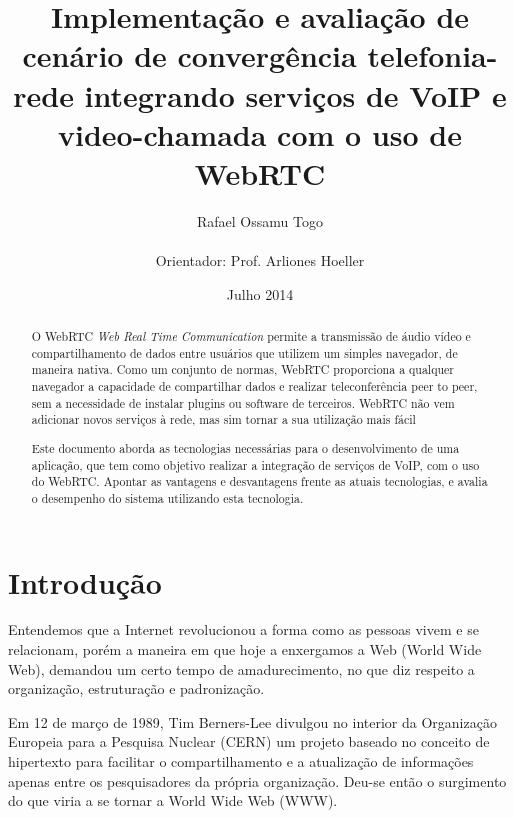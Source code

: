 \documentclass[ruledheader]{abnt} %
\begin{document}
\title{Implementação e avaliação de cenário de convergência telefonia-rede integrando serviços de VoIP e video-chamada com o uso de WebRTC}
\author{Rafael Ossamu Togo \\ \\ Orientador: Prof. Arliones Hoeller} %
\date{Julho 2014}

\maketitle %

\tableofcontents 

\begin{abstract}
O WebRTC \textit{Web Real Time Communication} permite a transmissão de áudio vídeo e compartilhamento de dados entre usuários que utilizem um simples navegador, de maneira nativa. Como um conjunto de normas, WebRTC proporciona a qualquer navegador a capacidade de compartilhar dados e realizar teleconferência peer to peer, sem a necessidade de instalar plugins ou software de terceiros. WebRTC não vem adicionar novos serviços à
rede, mas sim tornar a sua utilização mais fácil

Este documento aborda as tecnologias necessárias para o desenvolvimento de uma aplicação, que tem como objetivo realizar a integração de serviços de VoIP, com o uso do WebRTC. Apontar as vantagens e desvantagens frente as atuais tecnologias,  e avalia o desempenho do sistema utilizando esta tecnologia.  

\end{abstract}


\chapter{Introdução} %
\label{c_introducao} %
Entendemos que a Internet revolucionou a forma como as pessoas vivem e se relacionam, porém a maneira em que hoje a enxergamos a Web (World Wide Web), demandou um certo tempo de amadurecimento, no que diz respeito a organização, estruturação e padronização.
 
Em 12 de março de 1989, Tim Berners-Lee divulgou no interior da Organização Europeia para a Pesquisa Nuclear (CERN) um projeto baseado no conceito de hipertexto para facilitar o compartilhamento e a atualização de informações apenas entre os pesquisadores da própria organização. Deu-se então o surgimento do que viria a se tornar a World Wide Web (WWW). 
\end{document}
